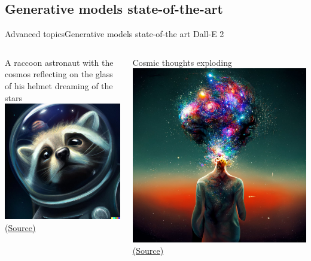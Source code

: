 \documentclass[10pt,compress]{beamer} %
\begin{document}
\subsection{Generative models state-of-the-art}
\begin{frame}{Advanced topics}{Generative models state-of-the art}
	\centering Dall-E 2
    \bigskip
    \centering
    \begin{columns}
	        A raccoon astronaut with the cosmos reflecting on the glass of his helmet dreaming of the stars\\\medskip
            \includegraphics[width=0.8\linewidth]{figs/racoon.jpg}\\
	        \centering \scriptsize\href{https://bdtechtalks.com/2022/04/11/openai-dall-e-2/}{(Source)}

	        Cosmic thoughts exploding\\\medskip
            \includegraphics[width=0.8\linewidth]{figs/cosmic.jpg}\\
	        \centering \scriptsize\href{https://t.co/mfgrJkYiy9}{(Source)}
    \end{columns}
\end{frame}
\end{document}

